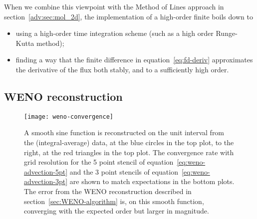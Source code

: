 When we combine this viewpoint with the Method of Lines approach in
section~\ref{adv:sec:mol_2d}, the implementation of a high-order finite boils
down to
\begin{itemize}
  \item using a high-order time integration scheme (such as a high order
  Runge-Kutta method);
  \item finding a way that the finite difference in equation~\eqref{eq:fd-deriv}
  approximates the derivative of the flux both stably, and to a sufficiently
  high order.
\end{itemize}

\subsection{WENO reconstruction}
\label{sec:WENO}

\begin{figure}
  \texttt{[image: weno-convergence]}
  \caption[Convergence rate of high-order reconstructions]{A smooth sine function is reconstructed on the unit interval from the (integral-average) data, at the blue circles in the top plot, to the right, at the red triangles in the top plot. The convergence rate with grid resolution for the 5 point stencil of equation~\eqref{eq:weno-advection-5pt} and the 3 point stencils of equation~\eqref{eq:weno-advection-3pt} are shown to match expectations in the bottom plots. The error from the WENO reconstruction described in section~\ref{sec:WENO-algorithm} is, on this smooth function, converging with the expected order but larger in magnitude.}
  \label{fig:weno-convergence}
\end{figure}

